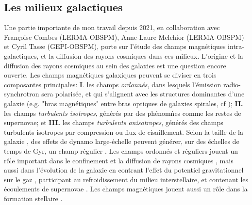 \newpage







\subsection*{Les milieux galactiques}

\pg
Une partie importante de mon travail depuis 2021, en collaboration avec Fran\c{c}oise Combes (LERMA-OBSPM), Anne-Laure Melchior (LERMA-OBSPM) et Cyril Tasse (GEPI-OBSPM), porte sur l'\'etude des champs magn\'etiques intra-galactiques, et la diffusion des rayons cosmiques dans ces milieux. L'origine et la diffusion des rayons cosmiques au sein des galaxies est une question encore ouverte. Les champs magn\'etiques galaxiques peuvent se diviser en trois composantes principales: \textbf{I}. les champs \textit{ordonn\'es}, dans lesquels l'\'emission radio-synchrotron sera polaris\'ee, et qui s'alignent avec les structures dominantes d'une galaxie (e.g. "bras magn\'etiques" entre bras optiques de galaxies spirales, cf \cite{1996NAWG.1996..262B}); \textbf{II. } les champs \textit{turbulents isotropes}, g\'en\'er\'es par des ph\'enom\`nes comme les restes de supernovae; et \textbf{III.} les champs \textit{turbulents anisotropes}, g\'en\'er\'es des champs turbulents isotropes par compression ou flux de cisaillement. Selon la taille de la galaxie \cite{2009A&A...494...21A}, des effets de dynamo large-\'echelle peuvent g\'en\'erer, sur des \'echelles de temps de Gyr, un champ r\'egulier \cite{1988ASSL..133.....R}. Les champs ordonn\'es et r\'eguliers jouent un r\^ole important dans le confinement et la diffusion de rayons cosmiques  \cite{2013PhPl...20e5501Z}, mais aussi dans l'\'evolution de la galaxie en contrant l'effet du potentiel gravitationnel sur le gaz \cite{1990ApJ...365..544B}, participant au refroidissement du milieu interstellaire, et contenant les \'ecoulements de supernovae \cite{2019MNRAS.488.5065E}. Les champs magn\'etiques jouent aussi un r\^ole dans la formation stellaire \cite{2019FrASS...6....7K}.

%
%




